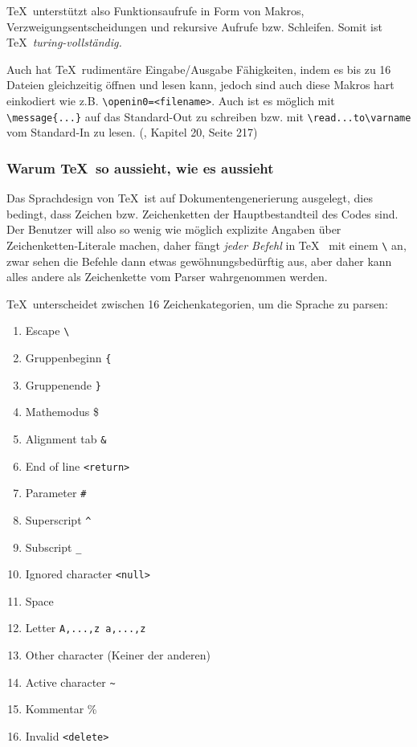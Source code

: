 \TeX~unterstützt also Funktionsaufrufe in Form von Makros,
Verzweigungsentscheidungen
und rekursive Aufrufe bzw. Schleifen. Somit ist \TeX~\emph{turing-vollständig.}

Auch hat \TeX~rudimentäre Eingabe/Ausgabe Fähigkeiten, indem es
bis zu 16 Dateien gleichzeitig öffnen und lesen kann, jedoch sind auch
diese Makros hart einkodiert wie z.B. \lstinline|\openin0=<filename>|.
Auch ist es möglich mit \lstinline|\message{...}| auf das Standard-Out zu schreiben
bzw. mit \lstinline|\read...to\varname| vom Standard-In zu lesen.
(\cite{tex-a}, Kapitel 20, Seite 217)

\subsubsection{Warum \TeX~so aussieht, wie es aussieht}

Das Sprachdesign von \TeX~ist auf Dokumentengenerierung ausgelegt, dies
bedingt, dass Zeichen bzw. Zeichenketten der Hauptbestandteil des Codes
sind. Der Benutzer will also so wenig wie möglich explizite Angaben über
Zeichenketten-Literale machen, daher fängt \emph{jeder Befehl} in \TeX~
mit einem \lstinline|\| an, zwar sehen die Befehle dann etwas gewöhnungsbedürftig
aus, aber daher kann alles andere als Zeichenkette vom Parser
wahrgenommen werden.

\TeX~unterscheidet zwischen 16 Zeichenkategorien, um die Sprache zu parsen:

\begin{enumerate}
  \item Escape \lstinline|\|
  \item Gruppenbeginn \lstinline|{|
  \item Gruppenende \lstinline|}|
  \item Mathemodus \$
  \item Alignment tab \lstinline|&|
  \item End of line \lstinline|<return>|
  \item Parameter \lstinline|#|
  \item Superscript \lstinline|^|
  \item Subscript \lstinline|_|
  \item Ignored character \lstinline|<null>|
  \item Space
  \item Letter \lstinline|A,...,z a,...,z|
  \item Other character (Keiner der anderen)
  \item Active character \lstinline|~|
  \item Kommentar \%
  \item Invalid \lstinline|<delete>|
\end{enumerate}


